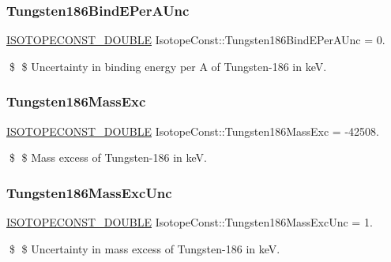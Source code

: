 \subsubsection{\texorpdfstring{Tungsten186\+Bind\+E\+Per\+A\+Unc}{Tungsten186BindEPerAUnc}}
{\footnotesize\ttfamily \mbox{\hyperlink{group___isotope_const-_macros_ga8f45a7272ce02c0b4c65c44636ed719a}{I\+S\+O\+T\+O\+P\+E\+C\+O\+N\+S\+T\+\_\+\+D\+O\+U\+B\+LE}} Isotope\+Const\+::\+Tungsten186\+Bind\+E\+Per\+A\+Unc = 0.}

\$ \$ Uncertainty in binding energy per A of Tungsten-\/186 in keV. \mbox{\label{group___isotope_const-_tungsten-_w186_ga0a4aa526be7262ed6ba14fbb06ba3c43}} 
\subsubsection{\texorpdfstring{Tungsten186\+Mass\+Exc}{Tungsten186MassExc}}
{\footnotesize\ttfamily \mbox{\hyperlink{group___isotope_const-_macros_ga8f45a7272ce02c0b4c65c44636ed719a}{I\+S\+O\+T\+O\+P\+E\+C\+O\+N\+S\+T\+\_\+\+D\+O\+U\+B\+LE}} Isotope\+Const\+::\+Tungsten186\+Mass\+Exc = -\/42508.}

\$ \$ Mass excess of Tungsten-\/186 in keV. \mbox{\label{group___isotope_const-_tungsten-_w186_ga614ede2f224306e3b2aeba2d246886ad}} 
\subsubsection{\texorpdfstring{Tungsten186\+Mass\+Exc\+Unc}{Tungsten186MassExcUnc}}
{\footnotesize\ttfamily \mbox{\hyperlink{group___isotope_const-_macros_ga8f45a7272ce02c0b4c65c44636ed719a}{I\+S\+O\+T\+O\+P\+E\+C\+O\+N\+S\+T\+\_\+\+D\+O\+U\+B\+LE}} Isotope\+Const\+::\+Tungsten186\+Mass\+Exc\+Unc = 1.}

\$ \$ Uncertainty in mass excess of Tungsten-\/186 in keV. \mbox{\label{group___isotope_const-_tungsten-_w186_ga05dbd70e2b01eabea9e805a06496ffaf}} 
